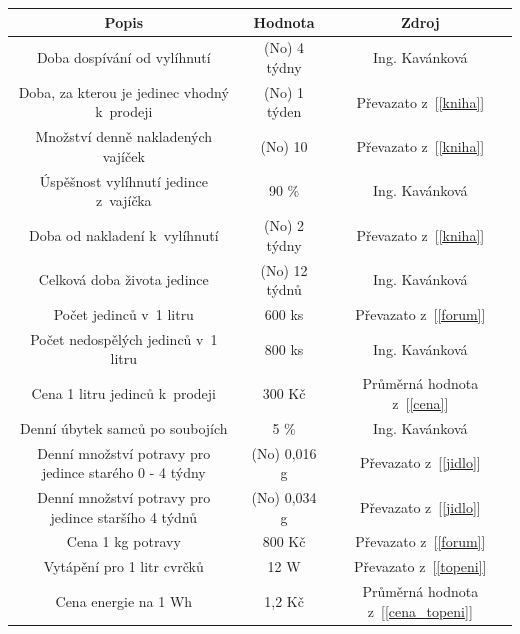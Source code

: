 \documentclass[11pt, a4paper, titlepage]{article}
\begin{document}
    \begin{table}[H]
        \begin{tabular}{|c|c|c|}

            \hline
            \textbf{Popis}                                         & \textbf{Hodnota}      & \textbf{Zdroj}                        \\ \hline
            Doba dospívání od vylíhnutí & (No) 4 týdny & Ing. Kavánková                   \\ \hline
            Doba, za kterou je jedinec vhodný k~prodeji & (No) 1 týden & Převazato z~[\ref{kniha}]             \\ \hline
            Množství denně nakladených vajíček & (No) 10 & Převazato z~[\ref{kniha}]             \\ \hline
            Úspěšnost vylíhnutí jedince z~vajíčka & 90 \%                 & Ing. Kavánková                   \\ \hline
            Doba od nakladení k~vylíhnutí & (No) 2 týdny & Převazato z~[\ref{kniha}]             \\ \hline
            Celková doba života jedince & (No) 12 týdnů & Ing. Kavánková                   \\ \hline
            Počet jedinců v~1 litru & 600 ks & Převazato z~[\ref{forum}]             \\ \hline
            Počet nedospělých jedinců v~1 litru & 800 ks & Ing. Kavánková              \\ \hline
            Cena 1 litru jedinců k~prodeji & 300 Kč & Průměrná hodnota z~[\ref{cena}]       \\ \hline
            Denní úbytek samců po soubojích & 5 \%                  & Ing. Kavánková                   \\ \hline
            Denní množství potravy pro jedince starého 0 - 4 týdny & (No) 0,016 g & Převazato z~[\ref{jidlo}]             \\ \hline
            Denní množství potravy pro jedince staršího 4 týdnů & (No) 0,034 g & Převazato z~[\ref{jidlo}]             \\ \hline
            Cena 1 kg potravy & 800 Kč & Převazato z~[\ref{forum}]             \\ \hline
            Vytápění pro 1 litr cvrčků & 12 W & Převazato z~[\ref{topeni}]            \\ \hline
            Cena energie na 1 Wh & 1,2 Kč & Průměrná hodnota z~[\ref{cena_topeni}]            \\ \hline
        \end{tabular}
    \end{table}
\end{document}
